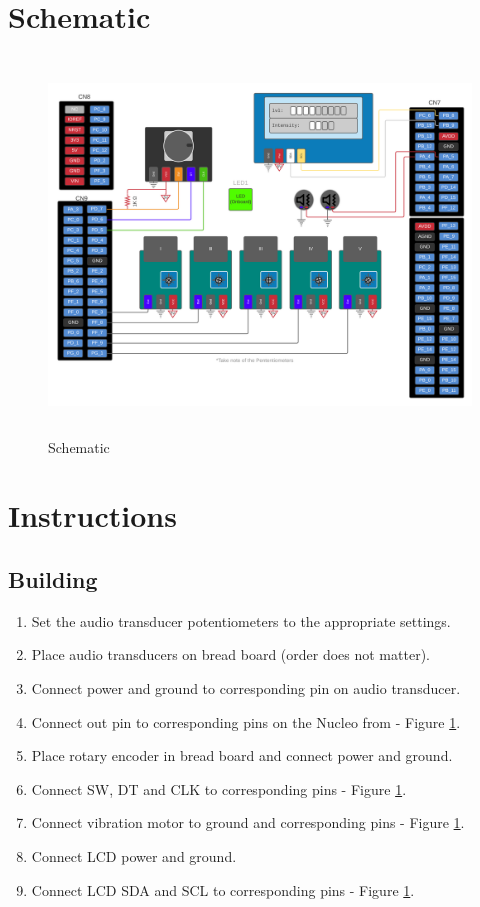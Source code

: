 \documentclass{article}
\begin{document}
\section{Schematic}
    \begin{figure}[h!]
        \begin{center}
            \includegraphics[height=10cm]{graphics/Schematic.png}
        \end{center}
        \caption{Schematic}
        \label{fig:Schematic}
    \end{figure}

\section{Instructions}
\subsection{Building}
\begin{enumerate}
    \item Set the audio transducer potentiometers to the appropriate settings.
    \item Place audio transducers on bread board (order does not matter).
    \item Connect power and ground to corresponding pin on audio transducer.
    \item Connect out pin to corresponding pins on the Nucleo from - Figure \ref{fig:Schematic}.
    \item Place rotary encoder in bread board and connect power and ground.
    \item Connect SW, DT and CLK to corresponding pins - Figure \ref{fig:Schematic}.
    \item Connect vibration motor to ground and corresponding pins - Figure \ref{fig:Schematic}.
    \item Connect LCD power and ground.
    \item Connect LCD SDA and SCL to corresponding pins - Figure \ref{fig:Schematic}.
\end{enumerate}
\end{document}
